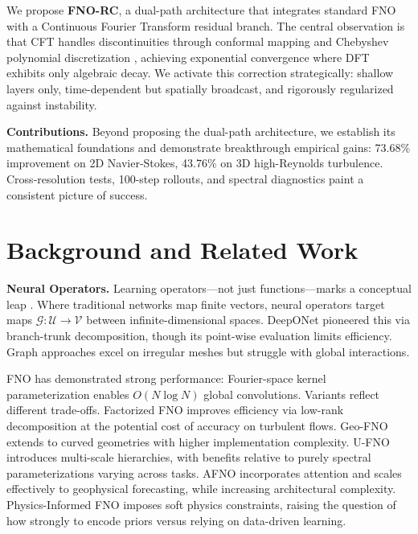 \documentclass[11pt]{article}
\newcommand{\G}{\mathcal{G}}
\begin{document}
We propose \textbf{FNO-RC}, a dual-path architecture that integrates standard FNO with a Continuous Fourier Transform residual branch. The central observation is that CFT handles discontinuities through conformal mapping and Chebyshev polynomial discretization \citep{barnett2010conformal}, achieving exponential convergence where DFT exhibits only algebraic decay. We activate this correction strategically: shallow layers only, time-dependent but spatially broadcast, and rigorously regularized against instability.

\textbf{Contributions.} Beyond proposing the dual-path architecture, we establish its mathematical foundations and demonstrate breakthrough empirical gains: 73.68\% improvement on 2D Navier-Stokes, 43.76\% on 3D high-Reynolds turbulence. Cross-resolution tests, 100-step rollouts, and spectral diagnostics paint a consistent picture of success.

\section{Background and Related Work}

\textbf{Neural Operators.} Learning operators—not just functions—marks a conceptual leap \citep{kovachki2021neural,azizzadenesheli2024neural}. Where traditional networks map finite vectors, neural operators target maps $\G: \mathcal{U} \rightarrow \mathcal{V}$ between infinite-dimensional spaces. DeepONet \citep{lu2021learning,wang2021learning} pioneered this via branch-trunk decomposition, though its point-wise evaluation limits efficiency. Graph approaches \citep{li2020multipole,li2020neural} excel on irregular meshes but struggle with global interactions.

FNO \citep{Li2020FNO} has demonstrated strong performance: Fourier-space kernel parameterization enables $O(N \log N)$ global convolutions. Variants reflect different trade-offs. Factorized FNO \citep{tran2021factorized} improves efficiency via low-rank decomposition at the potential cost of accuracy on turbulent flows. Geo-FNO \citep{li2023geometry} extends to curved geometries with higher implementation complexity. U-FNO \citep{wen2022u} introduces multi-scale hierarchies, with benefits relative to purely spectral parameterizations varying across tasks. AFNO \citep{guibas2021adaptive,pathak2022fourcastnet} incorporates attention and scales effectively to geophysical forecasting, while increasing architectural complexity. Physics-Informed FNO \citep{li2021physics} imposes soft physics constraints, raising the question of how strongly to encode priors versus relying on data-driven learning.
\end{document}
